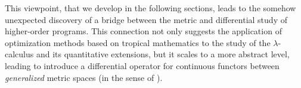This viewpoint, that we develop in the following sections, leads to the somehow unexpected discovery of a bridge between the metric and differential study of higher-order programs.
This connection not only suggests the application of optimization methods based on tropical mathematics to the study of the $\lambda$-calculus and its quantitative extensions, but it scales to a 
more abstract level, leading to introduce a 
differential operator for continuous functors between \emph{generalized} metric spaces (in the sense of \cite{Lawvere1973}). 

   
%
%
%
%
%
%
%
%
%



 
